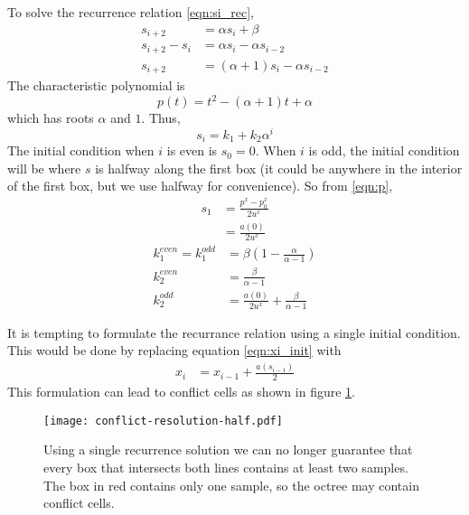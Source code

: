 \documentclass{egpubl}
\begin{document}
To solve the recurrence relation \eqref{eqn:si_rec},
\begin{align}
s_{i+2} &= \alpha s_i+\beta \\
s_{i+2}-s_i &= \alpha s_i-\alpha s_{i-2} \\
s_{i+2} &= (\alpha+1) s_i-\alpha s_{i-2}
\end{align}
The characteristic polynomial is
\begin{equation}
p(t) = t^2-(\alpha+1)t + \alpha
\end{equation}
which has roots $\alpha$ and $1$. Thus,
\begin{equation}
s_i = k_1 + k_2 \alpha^i
\end{equation}
The initial condition when $i$ is even is $s_0=0$. When $i$ is odd, the initial condition will be where $s$ is halfway along the first box (it could be anywhere in the interior of the first box, but we use halfway for convenience). So from \eqref{eqn:p},
\begin{align}
s_1 &= \frac{p^x-p_0^x}{2u^x} \\
    &= \frac{a(0)}{2u^x}
\end{align}
\begin{align}
k_1^{even} = k_1^{odd} &= \beta\left(1-\frac{\alpha}{\alpha-1}\right) \\
k_2^{even} &= \frac{\beta}{\alpha-1} \\
k_2^{odd} &= \frac{a(0)}{2u^x}+\frac{\beta}{\alpha-1}
\end{align}

It is tempting to formulate the recurrance relation using a single initial condition. This would be done by replacing equation \eqref{eqn:xi_init} with
\begin{align}
x_i &= x_{i-1} + \frac{a(s_{i-1})}{2}
\end{align}
This formulation can lead to conflict cells as shown in figure \ref{fig:conflict-resolution-half}.

\begin{figure}
  \centering
  \texttt{[image: conflict-resolution-half.pdf]}
  \caption{Using a single recurrence solution we can no longer guarantee that every box that intersects both lines contains at least two samples. The box in red contains only one sample, so the octree may contain conflict cells.
  }
  \label{fig:conflict-resolution-half}
\end{figure}
\end{document}
